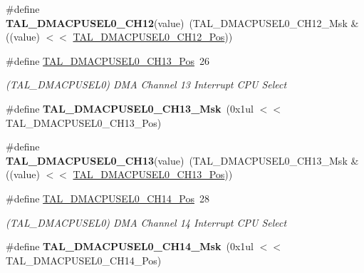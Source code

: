 \begin{DoxyCompactItemize}
\item 
\hypertarget{group___s_a_m_l21___t_a_l_gaef5d64b385f5c068783f17625171e03f}{}\#define {\bfseries T\+A\+L\+\_\+\+D\+M\+A\+C\+P\+U\+S\+E\+L0\+\_\+\+C\+H12}(value)~(T\+A\+L\+\_\+\+D\+M\+A\+C\+P\+U\+S\+E\+L0\+\_\+\+C\+H12\+\_\+\+Msk \& ((value) $<$$<$ \hyperlink{group___s_a_m_l21___t_a_l_ga0c4b3e0e6cbb842f4de5988d48d12c61}{T\+A\+L\+\_\+\+D\+M\+A\+C\+P\+U\+S\+E\+L0\+\_\+\+C\+H12\+\_\+\+Pos}))\label{group___s_a_m_l21___t_a_l_gaef5d64b385f5c068783f17625171e03f}

\item 
\hypertarget{group___s_a_m_l21___t_a_l_ga39ea94ff3d1020685eedec9aae1bc5b0}{}\#define \hyperlink{group___s_a_m_l21___t_a_l_ga39ea94ff3d1020685eedec9aae1bc5b0}{T\+A\+L\+\_\+\+D\+M\+A\+C\+P\+U\+S\+E\+L0\+\_\+\+C\+H13\+\_\+\+Pos}~26\label{group___s_a_m_l21___t_a_l_ga39ea94ff3d1020685eedec9aae1bc5b0}

\begin{DoxyCompactList}\small\item\em (T\+A\+L\+\_\+\+D\+M\+A\+C\+P\+U\+S\+E\+L0) D\+M\+A Channel 13 Interrupt C\+P\+U Select \end{DoxyCompactList}\item 
\hypertarget{group___s_a_m_l21___t_a_l_ga7e602657ce9d0810babbf9e92243baf9}{}\#define {\bfseries T\+A\+L\+\_\+\+D\+M\+A\+C\+P\+U\+S\+E\+L0\+\_\+\+C\+H13\+\_\+\+Msk}~(0x1ul $<$$<$ T\+A\+L\+\_\+\+D\+M\+A\+C\+P\+U\+S\+E\+L0\+\_\+\+C\+H13\+\_\+\+Pos)\label{group___s_a_m_l21___t_a_l_ga7e602657ce9d0810babbf9e92243baf9}

\item 
\hypertarget{group___s_a_m_l21___t_a_l_ga0dca813d8072eeda4df68a5a79b79d5f}{}\#define {\bfseries T\+A\+L\+\_\+\+D\+M\+A\+C\+P\+U\+S\+E\+L0\+\_\+\+C\+H13}(value)~(T\+A\+L\+\_\+\+D\+M\+A\+C\+P\+U\+S\+E\+L0\+\_\+\+C\+H13\+\_\+\+Msk \& ((value) $<$$<$ \hyperlink{group___s_a_m_l21___t_a_l_ga39ea94ff3d1020685eedec9aae1bc5b0}{T\+A\+L\+\_\+\+D\+M\+A\+C\+P\+U\+S\+E\+L0\+\_\+\+C\+H13\+\_\+\+Pos}))\label{group___s_a_m_l21___t_a_l_ga0dca813d8072eeda4df68a5a79b79d5f}

\item 
\hypertarget{group___s_a_m_l21___t_a_l_gac7f5dd501c8f977191de62ea369fed39}{}\#define \hyperlink{group___s_a_m_l21___t_a_l_gac7f5dd501c8f977191de62ea369fed39}{T\+A\+L\+\_\+\+D\+M\+A\+C\+P\+U\+S\+E\+L0\+\_\+\+C\+H14\+\_\+\+Pos}~28\label{group___s_a_m_l21___t_a_l_gac7f5dd501c8f977191de62ea369fed39}

\begin{DoxyCompactList}\small\item\em (T\+A\+L\+\_\+\+D\+M\+A\+C\+P\+U\+S\+E\+L0) D\+M\+A Channel 14 Interrupt C\+P\+U Select \end{DoxyCompactList}\item 
\hypertarget{group___s_a_m_l21___t_a_l_ga2bc8323eb00bf58fced03b9e32da8214}{}\#define {\bfseries T\+A\+L\+\_\+\+D\+M\+A\+C\+P\+U\+S\+E\+L0\+\_\+\+C\+H14\+\_\+\+Msk}~(0x1ul $<$$<$ T\+A\+L\+\_\+\+D\+M\+A\+C\+P\+U\+S\+E\+L0\+\_\+\+C\+H14\+\_\+\+Pos)\label{group___s_a_m_l21___t_a_l_ga2bc8323eb00bf58fced03b9e32da8214}


\end{DoxyCompactItemize}
